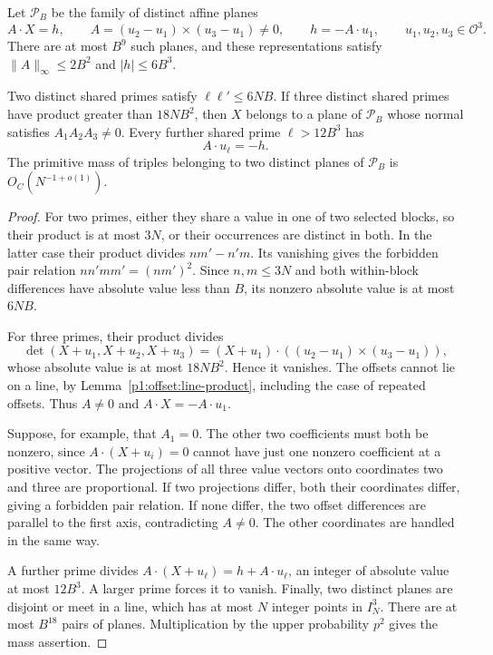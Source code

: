 Let $\mathscr P_B$ be the family of distinct affine planes
\[
 A\cdot X=h,\qquad
 A=(u_2-u_1)\times(u_3-u_1)\ne0,
 \qquad h=-A\cdot u_1,
 \qquad u_1,u_2,u_3\in\mathcal O^3.
\]
There are at most $B^9$ such planes, and these representations satisfy
$\|A\|_\infty\le2B^2$ and $|h|\le6B^3$.

\begin{proposition}
\label{p1:offset:forced-plane}
Two distinct shared primes satisfy $\ell\ell'\le6NB$.
If three distinct shared primes have product greater than $18NB^2$,
then $X$ belongs to a plane of $\mathscr P_B$ whose normal satisfies
$A_1A_2A_3\ne0$. Every further shared prime $\ell>12B^3$ has
\begin{equation}
 A\cdot u_\ell=-h.
 \label{p1:offset:subsequent-offset}
\end{equation}
The primitive mass of triples belonging to two distinct planes of
$\mathscr P_B$ is $O_C(N^{-1+o(1)})$.
\end{proposition}
\begin{proof}
For two primes, either they share a value in one of two selected blocks,
so their product is at most $3N$, or their occurrences are distinct in
both. In the latter case their product divides
$nm'-n'm$. Its vanishing gives the forbidden pair relation
$nn'mm'=(nm')^2$. Since $n,m\le3N$ and both within-block
differences have absolute value less than $B$, its nonzero absolute
value is at most $6NB$.

For three primes, their product divides
\[
 \det(X+u_1,X+u_2,X+u_3)
 =(X+u_1)\cdot((u_2-u_1)\times(u_3-u_1)),
\]
whose absolute value is at most $18NB^2$. Hence it vanishes.
The offsets cannot lie on a line, by
Lemma~\ref{p1:offset:line-product}, including the case of repeated
offsets. Thus $A\ne0$ and $A\cdot X=-A\cdot u_1$.

Suppose, for example, that $A_1=0$. The other two coefficients must
both be nonzero, since $A\cdot(X+u_i)=0$ cannot have just one
nonzero coefficient at a positive vector. The projections of all three
value vectors onto coordinates two and three are proportional. If two
projections differ, both their coordinates differ, giving a forbidden
pair relation. If none differ, the two offset differences are parallel
to the first axis, contradicting $A\ne0$. The other coordinates are
handled in the same way.

A further prime divides $A\cdot(X+u_\ell)=h+A\cdot u_\ell$,
an integer of absolute value at most $12B^3$. A larger prime forces
it to vanish. Finally, two distinct planes are disjoint or meet in a
line, which has at most $N$ integer points in $I_N^3$. There are at
most $B^{18}$ pairs of planes. Multiplication by the upper probability
$p^2$ gives the mass assertion.
\end{proof}

